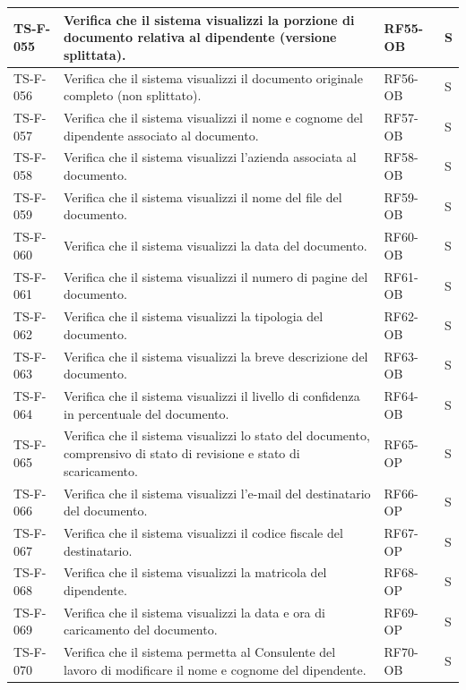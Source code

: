 \documentclass[a4paper,12pt]{article}
\begin{document}
\begin{longtable}{|p{2.2cm}|p{9.5cm}|p{2.3cm}|p{1.5cm}|}
    \hline
    TS-F-055 & Verifica che il sistema visualizzi la porzione di documento relativa al dipendente (versione splittata). & RF55-OB & S \\
    \hline
    TS-F-056 & Verifica che il sistema visualizzi il documento originale completo (non splittato). & RF56-OB & S \\
    \hline
\hline
    TS-F-057 & Verifica che il sistema visualizzi il nome e cognome del dipendente associato al documento. & RF57-OB & S \\
    \hline
    TS-F-058 & Verifica che il sistema visualizzi l'azienda associata al documento. & RF58-OB & S \\
    \hline
    TS-F-059 & Verifica che il sistema visualizzi il nome del file del documento. & RF59-OB & S \\
    \hline
    TS-F-060 & Verifica che il sistema visualizzi la data del documento. & RF60-OB & S \\
    \hline
    TS-F-061 & Verifica che il sistema visualizzi il numero di pagine del documento. & RF61-OB & S \\
    \hline
    TS-F-062 & Verifica che il sistema visualizzi la tipologia del documento. & RF62-OB & S \\
    \hline
    TS-F-063 & Verifica che il sistema visualizzi la breve descrizione del documento. & RF63-OB & S \\
    \hline
    TS-F-064 & Verifica che il sistema visualizzi il livello di confidenza in percentuale del documento. & RF64-OB & S \\
    \hline
    TS-F-065 & Verifica che il sistema visualizzi lo stato del documento, comprensivo di stato di revisione e stato di scaricamento. & RF65-OP & S \\
    \hline
    TS-F-066 & Verifica che il sistema visualizzi l'e-mail del destinatario del documento. & RF66-OP & S \\
    \hline
    TS-F-067 & Verifica che il sistema visualizzi il codice fiscale del destinatario. & RF67-OP & S \\
    \hline
    TS-F-068 & Verifica che il sistema visualizzi la matricola del dipendente. & RF68-OP & S \\
    \hline
    TS-F-069 & Verifica che il sistema visualizzi la data e ora di caricamento del documento. & RF69-OP & S \\
    \hline
    TS-F-070 & Verifica che il sistema permetta al Consulente del lavoro di modificare il nome e cognome del dipendente. & RF70-OB & S \\

\end{longtable}
\end{document}
